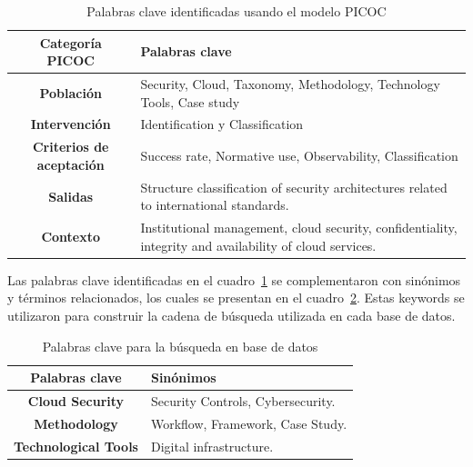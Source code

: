 \begin{table}[H]
	\centering
	\renewcommand{\arraystretch}{1.5} %
	\fontsize{9pt}{10pt}\selectfont %
	\begin{tabular}{|c|p{12cm}|} %
		\hline
		\textbf{Categoría \hbox{PICOC}} & \textbf{Palabras clave} \\
		\hline
		\textbf{Población}               & Security, Cloud, Taxonomy, Methodology, Technology Tools, Case study \\
		
		\textbf{Intervención}            & Identification y Classification     \\
		
		\textbf{Criterios de aceptación} & Success rate, Normative use, Observability, Classification         \\
		
		\textbf{Salidas}                 & Structure classification of security architectures related to international standards.         \\
		
		\textbf{Contexto}                & Institutional management, cloud security, confidentiality, integrity and availability of cloud services.  \\
		\hline
	\end{tabular}
	\caption{Palabras clave identificadas usando el modelo PICOC}\label{table:keywords-picoc}
\end{table}

Las palabras clave identificadas en el cuadro~\ref{table:keywords-picoc} se complementaron con sinónimos y términos relacionados, 
los cuales se presentan en el cuadro~\ref{tab:keywords}. Estas keywords se utilizaron para construir la cadena de búsqueda utilizada 
en cada base de datos.


\begin{table}[H]
	\centering
	\renewcommand{\arraystretch}{1.5} %
	\fontsize{9pt}{10pt}\selectfont %
	\begin{tabular}{|c|p{12cm}|} %
		\hline
		\textbf{Palabras clave} & \textbf{Sinónimos}\\
		\hline                                                             
		\textbf{Cloud Security} & Security Controls,  Cybersecurity.                  \\
	
		\textbf{Methodology}      & Workflow, Framework, Case Study. 				  \\
		
		\textbf{Technological Tools} & Digital infrastructure.                         \\
		\hline
	\end{tabular}
	\caption{Palabras clave para la búsqueda en base de datos}\label{tab:keywords}
\end{table}

